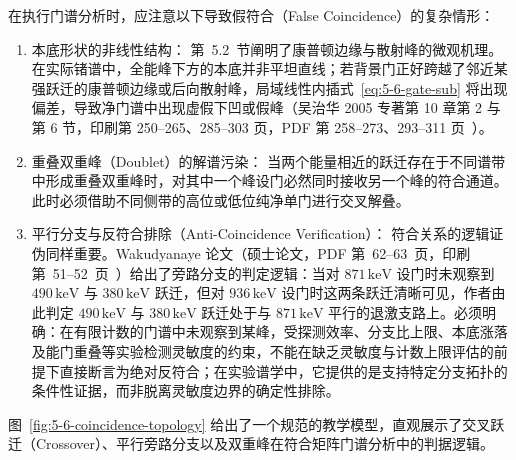 在执行门谱分析时，应注意以下导致假符合（False Coincidence）的复杂情形：
\begin{enumerate}
\item 本底形状的非线性结构：
第~5.2~节阐明了康普顿边缘与散射峰的微观机理。在实际锗谱中，全能峰下方的本底并非平坦直线；若背景门正好跨越了邻近某强跃迁的康普顿边缘或后向散射峰，局域线性内插式~\eqref{eq:5-6-gate-sub} 将出现偏差，导致净门谱中出现虚假下凹或假峰（吴治华 2005 专著第 10 章第 2 与第 6 节，印刷第 250--265、285--303 页，PDF 第 258--273、293--311 页~\cite{book-wu-nuclear-experiment-methods}）。
\item 重叠双重峰（Doublet）的解谱污染：
当两个能量相近的跃迁存在于不同谱带中形成重叠双重峰时，对其中一个峰设门必然同时接收另一个峰的符合通道。此时必须借助不同侧带的高位或低位纯净单门进行交叉解叠。
\item 平行分支与反符合排除（Anti-Coincidence Verification）：
符合关系的逻辑证伪同样重要。Wakudyanaye 论文（硕士论文，PDF 第~62--63~页，印刷第~51--52~页~\cite{wakudyanaye-2022-triaxiality-rotational-bands-133ce}）给出了旁路分支的判定逻辑：当对 $871\,\text{keV}$ 设门时未观察到 $490\,\text{keV}$ 与 $380\,\text{keV}$ 跃迁，但对 $936\,\text{keV}$ 设门时这两条跃迁清晰可见，作者由此判定 $490\,\text{keV}$ 与 $380\,\text{keV}$ 跃迁处于与 $871\,\text{keV}$ 平行的退激支路上。必须明确：在有限计数的门谱中未观察到某峰，受探测效率、分支比上限、本底涨落及能门重叠等实验检测灵敏度的约束，不能在缺乏灵敏度与计数上限评估的前提下直接断言为绝对反符合；在实验谱学中，它提供的是支持特定分支拓扑的条件性证据，而非脱离灵敏度边界的确定性排除。
\end{enumerate}

图~\ref{fig:5-6-coincidence-topology} 给出了一个规范的教学模型，直观展示了交叉跃迁（Crossover）、平行旁路分支以及双重峰在符合矩阵门谱分析中的判据逻辑。

